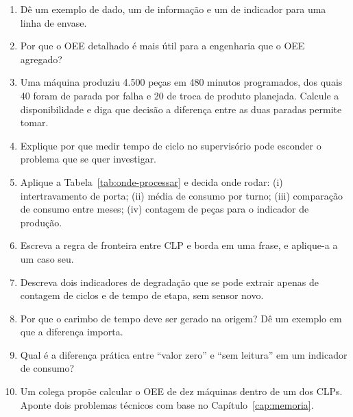 \begin{exercicios}
\begin{enumerate}[label=\alph*)]
  \item Dê um exemplo de dado, um de informação e um de indicador para uma linha de envase.
  \item Por que o OEE detalhado é mais útil para a engenharia que o OEE agregado?
  \item Uma máquina produziu 4.500 peças em 480 minutos programados, dos quais 40 foram de parada por
        falha e 20 de troca de produto planejada. Calcule a disponibilidade e diga que decisão a
        diferença entre as duas paradas permite tomar.
  \item Explique por que medir tempo de ciclo no supervisório pode esconder o problema que se quer
        investigar.
  \item Aplique a Tabela~\ref{tab:onde-processar} e decida onde rodar: (i) intertravamento de porta;
        (ii) média de consumo por turno; (iii) comparação de consumo entre meses; (iv) contagem de
        peças para o indicador de produção.
  \item Escreva a regra de fronteira entre CLP e borda em uma frase, e aplique-a a um caso seu.
  \item Descreva dois indicadores de degradação que se pode extrair apenas de contagem de ciclos e de
        tempo de etapa, sem sensor novo.
  \item Por que o carimbo de tempo deve ser gerado na origem? Dê um exemplo em que a diferença importa.
  \item Qual é a diferença prática entre ``valor zero'' e ``sem leitura'' em um indicador de consumo?
  \item Um colega propõe calcular o OEE de dez máquinas dentro de um dos CLPs. Aponte dois problemas
        técnicos com base no Capítulo~\ref{cap:memoria}.
\end{enumerate}
\end{exercicios}
